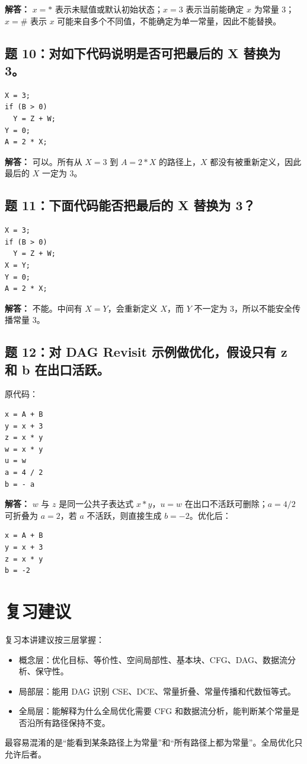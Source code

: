 \documentclass[UTF8,fontset=none,11pt]{ctexart}
\begin{document}
\textbf{解答：} \(x=*\) 表示未赋值或默认初始状态；\(x=3\) 表示当前能确定 \(x\) 为常量 3；\(x=\#\) 表示 \(x\) 可能来自多个不同值，不能确定为单一常量，因此不能替换。

\subsection*{题 10：对如下代码说明是否可把最后的 X 替换为 3。}

\begin{verbatim}
X = 3;
if (B > 0)
  Y = Z + W;
Y = 0;
A = 2 * X;
\end{verbatim}

\textbf{解答：} 可以。所有从 \(X=3\) 到 \(A=2*X\) 的路径上，\(X\) 都没有被重新定义，因此最后的 \(X\) 一定为 3。

\subsection*{题 11：下面代码能否把最后的 X 替换为 3？}

\begin{verbatim}
X = 3;
if (B > 0)
  Y = Z + W;
X = Y;
Y = 0;
A = 2 * X;
\end{verbatim}

\textbf{解答：} 不能。中间有 \(X=Y\)，会重新定义 \(X\)，而 \(Y\) 不一定为 3，所以不能安全传播常量 3。

\subsection*{题 12：对 DAG Revisit 示例做优化，假设只有 z 和 b 在出口活跃。}

原代码：

\begin{verbatim}
x = A + B
y = x + 3
z = x * y
w = x * y
u = w
a = 4 / 2
b = - a
\end{verbatim}

\textbf{解答：} \(w\) 与 \(z\) 是同一公共子表达式 \(x*y\)，\(u=w\) 在出口不活跃可删除；\(a=4/2\) 可折叠为 \(a=2\)，若 \(a\) 不活跃，则直接生成 \(b=-2\)。优化后：

\begin{verbatim}
x = A + B
y = x + 3
z = x * y
b = -2
\end{verbatim}

\section*{复习建议}

复习本讲建议按三层掌握：

\begin{itemize}
  \item 概念层：优化目标、等价性、空间局部性、基本块、CFG、DAG、数据流分析、保守性。
  \item 局部层：能用 DAG 识别 CSE、DCE、常量折叠、常量传播和代数恒等式。
  \item 全局层：能解释为什么全局优化需要 CFG 和数据流分析，能判断某个常量是否沿所有路径保持不变。
\end{itemize}

最容易混淆的是“能看到某条路径上为常量”和“所有路径上都为常量”。全局优化只允许后者。
\end{document}
